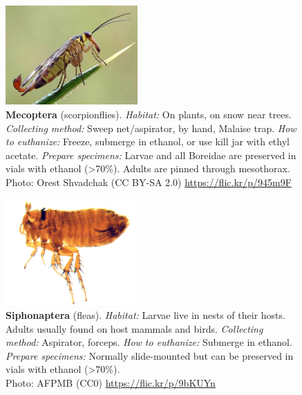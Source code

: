 \documentclass[letterpaper, 11pt]{article}
\begin{document}
\begin{figure}
  \caption{\textbf{Mecoptera} (scorpionflies). \textit{Habitat:} On plants, on snow near trees. \textit{Collecting method:} Sweep net/aspirator, by hand, Malaise trap. \textit{How to euthanize:} Freeze, submerge in ethanol, or use kill jar with ethyl acetate. \textit{Prepare specimens:} Larvae and all Boreidae are preserved in vials with ethanol (\textgreater70\%). Adults are pinned through mesothorax.\\ Photo: Orest Shvadchak (CC BY-SA 2.0) \url{https://flic.kr/p/945m9F}}
  \includegraphics[width=0.45\textwidth]{Mecoptera}
\end{figure}

\begin{figure}
  \caption{\textbf{Siphonaptera} (fleas). \textit{Habitat:} Larvae live in nests of their hosts. Adults usually found on host mammals and birds. \textit{Collecting method:} Aspirator, forceps. \textit{How to euthanize:} Submerge in ethanol. \textit{Prepare specimens:} Normally slide-mounted but can be preserved in vials with ethanol (\textgreater70\%).\\ Photo: AFPMB (CC0) \url{https://flic.kr/p/9bKUYn}}
  \includegraphics[width=0.45\textwidth]{Siphonaptera}
\end{figure}

\clearpage
\end{document}
